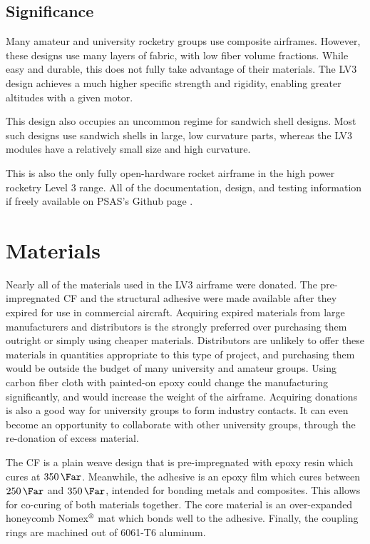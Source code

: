 \documentclass{aiaa-tc}%
\newcommand{\mathregistered}{\text{\textregistered}}
\begin{document}
\subsection{Significance}
Many amateur and university rocketry groups use composite airframes. However, these designs use many layers of fabric, with low fiber volume fractions.
While easy and durable, this does not fully take advantage of their materials. The LV3 design achieves a much higher specific strength and rigidity, enabling greater altitudes with a given motor. 

This design also occupies an uncommon regime for sandwich shell designs. Most such designs use sandwich shells in large, low curvature parts, whereas the LV3 modules have a relatively small size and high curvature.

This is also the only fully open-hardware rocket airframe in the high power rocketry Level 3 range. All of the documentation, design, and testing information if freely available on PSAS's Github page \cite{LV3repo}.

\section{Materials}
Nearly all of the materials used in the LV3 airframe were donated. The pre-impregnated CF and the structural adhesive were made available after they expired for use in commercial aircraft. 
Acquiring expired materials from large manufacturers and distributors is the strongly preferred over purchasing them outright or simply using cheaper materials. 
Distributors are unlikely to offer these materials in quantities appropriate to this type of project, and purchasing them would be outside the budget of many university and amateur groups. 
Using carbon fiber cloth with painted-on epoxy could change the manufacturing significantly, and would increase the weight of the airframe. 
Acquiring donations is also a good way for university groups to form industry contacts. It can even become an opportunity to collaborate with other university groups, through the re-donation of excess material. 

The CF is a plain weave design that is pre-impregnated with epoxy resin which cures at $\SI{350}{\Far}$.
Meanwhile, the adhesive is an epoxy film which cures between $\SI{250}{\Far}$ and $\SI{350}{\Far}$, intended for bonding metals and composites. 
This allows for co-curing of both materials together. The core material is an over-expanded honeycomb Nomex$^\mathregistered$ mat which bonds well to the adhesive.
Finally, the coupling rings are machined out of 6061-T6 aluminum. 
\end{document}

